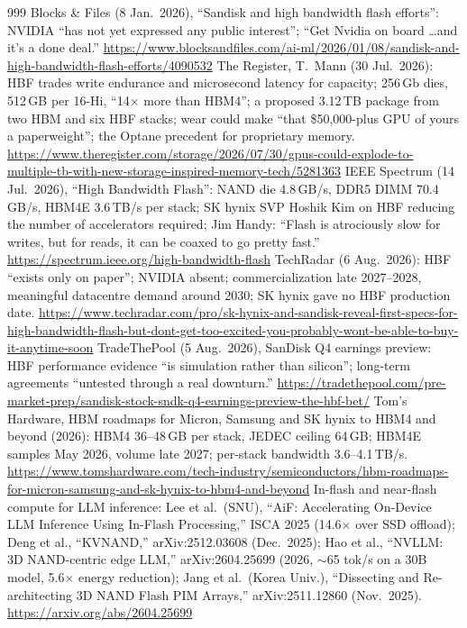 \begin{thebibliography}{999}
 Blocks \& Files (8 Jan.\ 2026), ``Sandisk and high bandwidth flash efforts'': NVIDIA ``has not yet expressed any public interest''; ``Get Nvidia on board \ldots and it's a done deal.'' \url{https://www.blocksandfiles.com/ai-ml/2026/01/08/sandisk-and-high-bandwidth-flash-efforts/4090532}
 The Register, T.~Mann (30 Jul.\ 2026): HBF trades write endurance and microsecond latency for capacity; 256\,Gb dies, 512\,GB per 16-Hi, ``14$\times$ more than HBM4''; a proposed 3.12\,TB package from two HBM and six HBF stacks; wear could make ``that \$50,000-plus GPU of yours a paperweight''; the Optane precedent for proprietary memory. \url{https://www.theregister.com/storage/2026/07/30/gpus-could-explode-to-multiple-tb-with-new-storage-inspired-memory-tech/5281363}
 IEEE Spectrum (14 Jul.\ 2026), ``High Bandwidth Flash'': NAND die 4.8\,GB/s, DDR5 DIMM 70.4\,GB/s, HBM4E 3.6\,TB/s per stack; SK hynix SVP Hoshik Kim on HBF reducing the number of accelerators required; Jim Handy: ``Flash is atrociously slow for writes, but for reads, it can be coaxed to go pretty fast.'' \url{https://spectrum.ieee.org/high-bandwidth-flash}
 TechRadar (6 Aug.\ 2026): HBF ``exists only on paper''; NVIDIA absent; commercialization late 2027--2028, meaningful datacentre demand around 2030; SK hynix gave no HBF production date. \url{https://www.techradar.com/pro/sk-hynix-and-sandisk-reveal-first-specs-for-high-bandwidth-flash-but-dont-get-too-excited-you-probably-wont-be-able-to-buy-it-anytime-soon}
 TradeThePool (5 Aug.\ 2026), SanDisk Q4 earnings preview: HBF performance evidence ``is simulation rather than silicon''; long-term agreements ``untested through a real downturn.'' \url{https://tradethepool.com/pre-market-prep/sandisk-stock-sndk-q4-earnings-preview-the-hbf-bet/}
 Tom's Hardware, HBM roadmaps for Micron, Samsung and SK hynix to HBM4 and beyond (2026): HBM4 36--48\,GB per stack, JEDEC ceiling 64\,GB; HBM4E samples May 2026, volume late 2027; per-stack bandwidth 3.6--4.1\,TB/s. \url{https://www.tomshardware.com/tech-industry/semiconductors/hbm-roadmaps-for-micron-samsung-and-sk-hynix-to-hbm4-and-beyond}
 In-flash and near-flash compute for LLM inference: Lee et al.\ (SNU), ``AiF: Accelerating On-Device LLM Inference Using In-Flash Processing,'' ISCA 2025 (14.6$\times$ over SSD offload); Deng et al., ``KVNAND,'' arXiv:2512.03608 (Dec.\ 2025); Hao et al., ``NVLLM: 3D NAND-centric edge LLM,'' arXiv:2604.25699 (2026, $\sim$65 tok/s on a 30B model, 5.6$\times$ energy reduction); Jang et al.\ (Korea Univ.), ``Dissecting and Re-architecting 3D NAND Flash PIM Arrays,'' arXiv:2511.12860 (Nov.\ 2025). \url{https://arxiv.org/abs/2604.25699}

\end{thebibliography}

